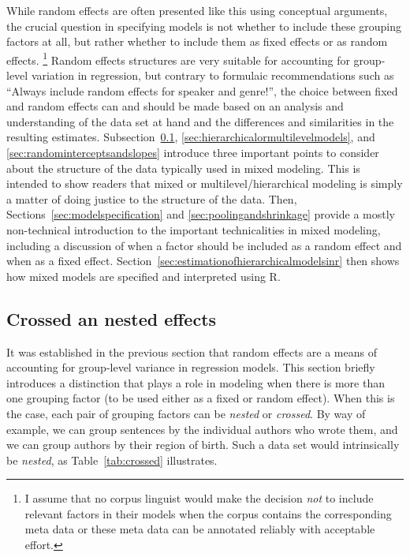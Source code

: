 \documentclass[a4paper,12pt]{article}
\begin{document}
While random effects are often presented like this using conceptual arguments, the crucial question in specifying models is not whether to include these grouping factors at all, but rather whether to include them as fixed effects or as random effects.%
\footnote{I assume that no corpus linguist would make the decision \textit{not} to include relevant factors in their models when the corpus contains the corresponding meta data or these meta data can be annotated reliably with acceptable effort.}
Random effects structures are very suitable for accounting for group-level variation in regression, but contrary to formulaic recommendations such as ``Always include random effects for speaker and genre!'', the choice between fixed and random effects can and should be made based on an analysis and understanding of the data set at hand and the differences and similarities in the resulting estimates.
Subsection~\ref{sec:crossedandnestedeffects}, \ref{sec:hierarchicalormultilevelmodels}, and \ref{sec:randominterceptsandslopes} introduce three important points to consider about the structure of the data typically used in mixed modeling.
This is intended to show readers that mixed or multilevel\slash hierarchical modeling is simply a matter of doing justice to the structure of the data.
Then, Sections~\ref{sec:modelspecification} and \ref{sec:poolingandshrinkage} provide a mostly non-technical introduction to the important technicalities in mixed modeling, including a discussion of when a factor should be included as a random effect and when as a fixed effect.
Section~\ref{sec:estimationofhierarchicalmodelsinr} then shows how mixed models are specified and interpreted using R.


\subsection{Crossed an nested effects}
\label{sec:crossedandnestedeffects}

It was established in the previous section that random effects are a means of accounting for group-level variance in regression models.
This section briefly introduces a distinction that plays a role in modeling when there is more than one grouping factor (to be used either as a fixed or random effect).
When this is the case, each pair of grouping factors can be \textit{nested} or \textit{crossed}.
By way of example, we can group sentences by the individual authors who wrote them, and we can group authors by their region of birth.
Such a data set would intrinsically be \textit{nested}, as Table~\ref{tab:crossed} illustrates.
\end{document}
